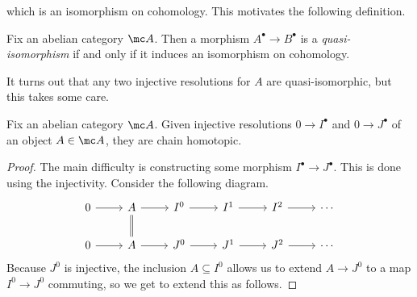 \documentclass[../notes.tex]{subfiles}
\begin{document}
which is an isomorphism on cohomology. This motivates the following definition.
\begin{definition}
	Fix an abelian category $\mc A$. Then a morphism $A^\bullet\to B^\bullet$ is a \textit{quasi-isomorphism} if and only if it induces an isomorphism on cohomology.
\end{definition}
It turns out that any two injective resolutions for $A$ are quasi-isomorphic, but this takes some care.
\begin{proposition} \label{prop:inj-res-are-homotopic}
	Fix an abelian category $\mc A$. Given injective resolutions $0\to I^\bullet$ and $0\to J^\bullet$ of an object $A\in\mc A$, they are chain homotopic.
\end{proposition}
\begin{proof}
	The main difficulty is constructing some morphism $I^\bullet\to J^\bullet$. This is done using the injectivity. Consider the following diagram.
	\[\begin{tikzcd}
		0 & A & {I^0} & {I^1} & {I^2} & \cdots \\
		0 & A & {J^0} & {J^1} & {J^2} & \cdots
		\arrow[from=1-1, to=1-2]
		\arrow[from=1-2, to=1-3]
		\arrow[from=1-3, to=1-4]
		\arrow[from=1-4, to=1-5]
		\arrow[from=1-5, to=1-6]
		\arrow[from=2-1, to=2-2]
		\arrow[from=2-2, to=2-3]
		\arrow[from=2-3, to=2-4]
		\arrow[from=2-4, to=2-5]
		\arrow[from=2-5, to=2-6]
		\arrow[Rightarrow, no head, from=1-2, to=2-2]
	\end{tikzcd}\]
	Because $J^0$ is injective, the inclusion $A\subseteq I^0$ allows us to extend $A\to J^0$ to a map $I^0\to J^0$ commuting, so we get to extend this as follows.

\end{proof}
\end{document}
